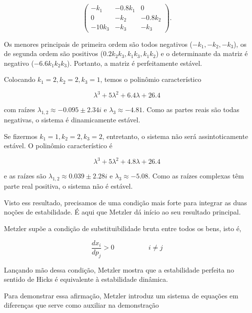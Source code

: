 \documentclass[
	12pt,				%
	openright,			%
	twoside,			%
	a4paper,			%
	english,			%
	french,				%
	spanish,			%
	brazil				%
	]{abntex2}
\newcommand{\espaco}{\hspace{5em}}
\begin{document}
\begin{equation}
	\begin{pmatrix}
		-k_1   & -0.8k_1 & 0 \\
		0      & -k_2    & -0.8k_2 \\
		-10k_3 & -k_3    & -k_3
	\end{pmatrix}
	.
\end{equation}

Os menores principais de primeira ordem são todos negativos ($-k_1, -k_2, -k_3$), os de segunda
ordem são positivos ($0.2k_2k_3, k_1k_3, k_1k_2$) e o determinante da matriz é
negativo ($-6.6k_1k_2k_3$). Portanto, a matriz é perfeitamente estável.

Colocando $k_1 = 2, k_2 = 2, k_3 = 1$, temos o polinômio característico

\begin{equation}
	\lambda^3 + 5\lambda^2 + 6.4\lambda + 26.4
\end{equation}

com raízes $\lambda_{1, 2} \approx -0.095 \pm 2.34i$ e $\lambda_3 \approx -4.81$.
Como as partes reais são todas negativas, o sistema é dinamicamente estável.

Se fizermos $k_1 = 1, k_2 = 2, k_3 = 2$, entretanto, o sistema não será assintoticamente estável.
O polinômio característico é

\begin{equation}
	\lambda^3 + 5\lambda^2 + 4.8\lambda + 26.4
\end{equation}

e as raízes são $\lambda_{1, 2} \approx 0.039 \pm 2.28i$ e $\lambda_3 \approx - 5.08$.
Como as raízes complexas têm parte real positiva, o sistema não é estável.

Visto ess resultado, precisamos de uma condição mais forte para integrar as duas noções de
estabilidade. É aqui que Metzler dá início ao seu resultado principal.

Metzler supõe a condição de substituibilidade bruta entre todos os bens, isto é,

\begin{equation}
	\frac{dx_i}{dp_j} > 0 \espaco i \neq j
\end{equation}

Lançando mão dessa condição, Metzler mostra que a estabilidade perfeita no sentido
de Hicks é equivalente à estabilidade dinâmica.

Para demonstrar essa afirmação, Metzler introduz um sistema de equações em diferenças
que serve como auxiliar na demonstração
\end{document}
